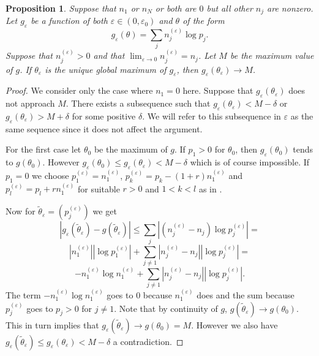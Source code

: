 \documentclass{article}
\theoremstyle{plain}
\newtheorem{proposition} {\bf Proposition} [section]
\theoremstyle{definition}
\begin{document}
\begin{proposition}\label{approximation}
	Suppose that $n_1$ or $n_N$ or both are $0$ but all other $n_j$ are nonzero.
	Let $g_\varepsilon$ be a function of both $\varepsilon\in(0,\varepsilon_0)$ and
	$\theta$ of the form $$g_\varepsilon(\theta)=\sum_jn^{(\varepsilon)}_j\log p_j.$$
	Suppose that $n^{(\varepsilon)}_j>0$ and that $\lim_{\varepsilon\to0}
	n^{(\varepsilon)}_j=n_j$.
	Let $M$ be the maximum value of $g$. 
	If $\theta_\varepsilon$ is the unique global maximum of $g_\varepsilon$, then
	$g_\varepsilon(\theta_\varepsilon)
	\to M$.
\end{proposition}
\begin{proof}
	We consider only the case where $n_1=0$ here. Suppose that $g_\varepsilon(
	\theta_\varepsilon)$ does not approach $M$. There exists a subsequence such
	that $g_\varepsilon(\theta_\varepsilon)<M-\delta$ or $g_\varepsilon(
	\theta_\varepsilon)>M+\delta$ for some positive $\delta$. We will refer
	to this subsequence in $\varepsilon$ as the same sequence since it does
	not affect the argument.

	For the first case let $\theta_0$ be the maximum of $g$. If $p_1>0$ for
	$\theta_0$, then $g_\varepsilon(\theta_0)$ tends to $g(\theta_0)$. However
	$g_\varepsilon(\theta_0)\leq g_\varepsilon(\theta_\varepsilon)<M-\delta$ which
	is of course impossible. If $p_1=0$ we choose $p^{(\varepsilon)}_1=n^{(\varepsilon)}_1$,
	$p^{(\varepsilon)}_k=p_k-(1+r)n^{(\varepsilon)}_1$ and
	$p^{(\varepsilon)}_l=p_l+rn^{(\varepsilon)}_1$
	for suitable $r>0$ and $1<k<l$ as in .

	Now for
	$\tilde\theta_\varepsilon=(p^{(\varepsilon)}_j)$ we get
	$$|g_\varepsilon(\tilde\theta_\varepsilon)-g(\tilde\theta_\varepsilon)|\leq
	\sum_j |(n^{(\varepsilon)}_j-n_j)\log p^{(\varepsilon)}_j|=$$$$
	|n^{(\varepsilon)}_1||\log p^{(\varepsilon)}_1|+
	\sum_{j\neq1} |n^{(\varepsilon)}_j-n_j||\log p^{(\varepsilon)}_j|=$$$$
	-n^{(\varepsilon)}_1\log n^{(\varepsilon)}_1+
	\sum_{j\neq1} |n^{(\varepsilon)}_j-n_j||\log p^{(\varepsilon)}_j|.$$
	The term $-n^{(\varepsilon)}_1\log n^{(\varepsilon)}_1$ goes to $0$
	because $n^{(\varepsilon)}_1$ does and the sum
	because $p^{(\varepsilon)}_j$ goes to $p_j>0$ for $j\neq1$. Note that by
	continuity of $g$, $g(\tilde\theta_\varepsilon)\to g(\theta_0)$. This in turn implies
	that $g_\varepsilon(\tilde\theta_\varepsilon)\to g(\theta_0)=M$. However we also
	have $g_\varepsilon(\tilde\theta_\varepsilon)\leq g_\varepsilon(\theta_\varepsilon)
	<M-\delta$
	a contradiction.


\end{proof}
\end{document}
